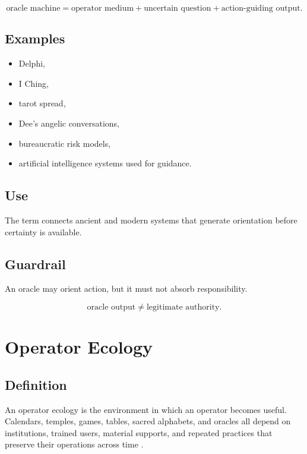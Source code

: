 \documentclass[11pt]{book}
\begin{document}
\[
\text{oracle machine} =
\text{operator medium} + \text{uncertain question} + \text{action-guiding output}.
\]

\subsection*{Examples}

\begin{itemize}
    \item Delphi,
    \item I Ching,
    \item tarot spread,
    \item Dee's angelic conversations,
    \item bureaucratic risk models,
    \item artificial intelligence systems used for guidance.
\end{itemize}

\subsection*{Use}

The term connects ancient and modern systems that generate orientation before certainty is available.

\subsection*{Guardrail}

An oracle may orient action, but it must not absorb responsibility.

\[
\text{oracle output} \neq \text{legitimate authority}.
\]

\section{Operator Ecology}

\subsection*{Definition}

An operator ecology is the environment in which an operator becomes useful. Calendars, temples, games, tables, sacred alphabets, and oracles all depend on institutions, trained users, material supports, and repeated practices that preserve their operations across time \cite{Assmann2011CulturalMemory,Yates1966ArtMemory,Aveni1989EmpiresTime,Murray1952BoardGames}.
\end{document}
